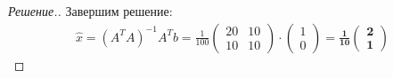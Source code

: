 \documentclass[a4paper]{article}
\theoremstyle{remark}
\begin{document}
\begin{proof}[Решение.]
        Завершим решение:
        \begin{align*}
          \hat{x} = (A^TA)^{-1}A^Tb = 
          \frac{1}{100} \begin{pmatrix}
            20 & 10 \\
            10 & 10
          \end{pmatrix} \cdot \begin{pmatrix}
            1 \\
            0
          \end{pmatrix} = 
          \frac{\bm{1}}{\bm{10}}\begin{pmatrix}
            \bm{2} \\
            \bm{1}
          \end{pmatrix}
        \end{align*}
        \end{proof}
    
\end{document}
